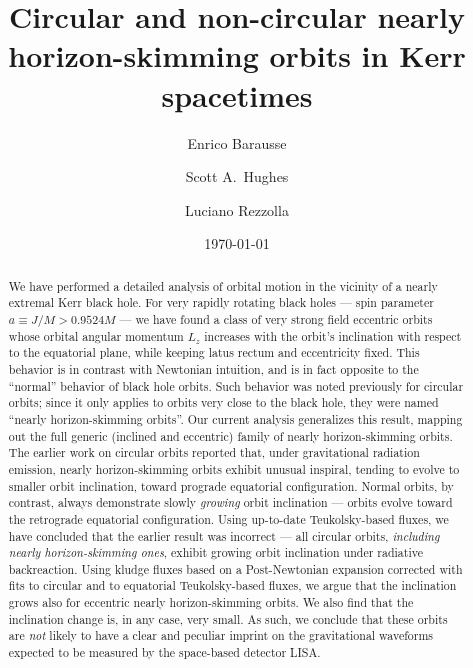 \documentclass[aps,prd,twocolumn,showpacs,groupedaddress,nofootinbib]{revtex4}
\begin{document}
\title{Circular and non-circular nearly horizon-skimming orbits in
  Kerr spacetimes} 
\author{Enrico Barausse}

\author{Scott A.\ Hughes}

\author{Luciano Rezzolla}

\date{\today}
\begin{abstract}
  We have performed a detailed analysis of orbital motion in the
  vicinity of a nearly extremal Kerr black hole.  For very rapidly
  rotating black holes --- spin parameter $a \equiv J/M > 0.9524M$ ---
  we have found a class of very strong field eccentric orbits whose
  orbital angular momentum $L_z$ increases with the orbit's
  inclination with respect to the equatorial plane, while keeping
  latus rectum and eccentricity fixed.  This behavior is in contrast
  with Newtonian intuition, and is in fact opposite to the ``normal''
  behavior of black hole orbits.  Such behavior was noted previously
  for circular orbits; since it only applies to orbits very close to
  the black hole, they were named ``nearly horizon-skimming orbits''.
  Our current analysis generalizes this result, mapping out the full
  generic (inclined and eccentric) family of nearly horizon-skimming
  orbits.  The earlier work on circular orbits reported that, under
  gravitational radiation emission, nearly horizon-skimming orbits
  exhibit unusual inspiral, tending to evolve to smaller orbit
  inclination, toward prograde equatorial configuration.  Normal
  orbits, by contrast, always demonstrate slowly {\it growing} orbit
  inclination --- orbits evolve toward the retrograde equatorial
  configuration.  Using up-to-date Teukolsky-based fluxes, we have
  concluded that the earlier result was incorrect --- all circular orbits, {\it
  including nearly horizon-skimming ones}, exhibit growing orbit
  inclination under radiative backreaction. Using kludge fluxes based on
  a Post-Newtonian expansion corrected with fits to circular and to equatorial Teukolsky-based fluxes,
  we argue that the inclination grows also for eccentric nearly horizon-skimming orbits.
  We also find that the inclination change is, in any case, very small.  As such, we
  conclude that these orbits are {\it not} likely to have a clear
  and peculiar imprint on the gravitational waveforms expected to be
  measured by the space-based detector LISA.
\end{abstract}
\end{document}
